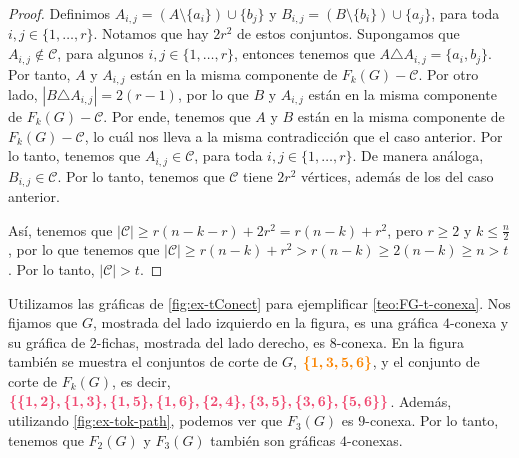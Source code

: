 \begin{proof}
Definimos $A_{i,j} = (A\setminus \{a_i\}) \cup \{b_j\}$ y $B_{i,j} = (B\setminus
\{b_i\}) \cup \{a_j\}$, para toda 
\linebreak
$ i, j \in \{1, \dots, r\}$. Notamos que hay
$2r^2$ de estos conjuntos. Supongamos que $A_{i,j} \notin \mathcal{C}$, para
algunos $ i, j \in \{1, \dots, r\}$, entonces tenemos que $A \triangle A_{i,j} =
\{a_i, b_j\}$. Por tanto, $A$ y $A_{i,j}$ est\'an en la misma componente de
$F_k(G)- \mathcal{C}$. Por otro lado, $|B \triangle A_{i,j}| = 2 (r-1)$, por lo
que $B$ y $A_{i,j}$ est\'an en la misma componente de $F_k(G) - \mathcal{C}$.
Por ende, tenemos que $A$ y $B$ est\'an en la misma componente de
$F_k(G)-\mathcal{C}$, lo cu\'al nos lleva a la misma contradicci\'on que el caso
anterior. Por lo tanto, tenemos que $A_{i,j} \in \mathcal{C}$, para toda $i, j
\in \{1, \dots, r\}$. De manera an\'aloga, $B_{i,j} \in \mathcal{C}$. Por lo
tanto, tenemos que $\mathcal{C}$ tiene $2r^2$ v\'ertices, adem\'as de los del
caso anterior.

As\'i, tenemos que $|\mathcal{C}|\geq r(n-k-r)+2r^2 = r(n-k) + r^2$, pero $r
\geq 2$ y $k \leq \frac{n}{2}$, por lo que tenemos que $|\mathcal{C}| \geq
r(n-k)+r^2 > r(n-k) \geq 2(n-k) \geq n >t$. Por lo tanto, $|\mathcal{C}|>t$.
\end{proof} 

Utilizamos las gr\'aficas de \cref{fig:ex-tConect} para ejemplificar
\cref{teo:FG-t-conexa}. Nos fijamos que $G$, mostrada del lado izquierdo en la
figura, es una gr\'afica $4$-conexa y su gr\'afica de $2$-fichas, mostrada del
lado derecho, es $8$-conexa. En la figura tambi\'en se muestra el conjuntos de
corte de $G$, ${\color{naranja}\boldsymbol{ \{1,3,5,6\}}}$, y el conjunto de
corte de $F_k(G)$, es decir, ${\color{fushia}\boldsymbol
{\{\{1,2\},\{1,3\},\{1,5\},\{1,6\},\{2,4\},\{3,5\},\{3,6\},\{5,6\}\}}}$.
Adem\'as, utilizando \cref{fig:ex-tok-path}, podemos ver que $F_3(G)$ es
$9$-conexa. Por lo tanto, tenemos que $F_2(G)$ y $F_3(G)$ tambi\'en son
gr\'aficas $4$-conexas.

